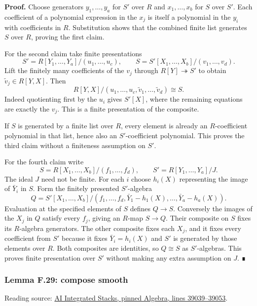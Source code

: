 \documentclass[11pt,a4paper,openany]{report}
\begin{document}
\textbf{Proof.} Choose generators \(y_1,\ldots,y_a\) for \(S'\) over \(R\) and \(x_1,\ldots,x_b\) for \(S\) over \(S'\). Each coefficient of a polynomial expression in the \(x_j\) is itself a polynomial in the \(y_i\) with coefficients in \(R\). Substitution shows that the combined finite list generates \(S\) over \(R\), proving the first claim.

For the second claim take finite presentations \[S'=R[Y_1,\ldots,Y_a]/(u_1,\ldots,u_c),\qquad
S=S'[X_1,\ldots,X_b]/(v_1,\ldots,v_d).\] Lift the finitely many coefficients of the \(v_j\) through \(R[Y]\twoheadrightarrow S'\) to obtain \(\widetilde v_j\in R[Y,X]\). Then \[R[Y,X]/(u_1,\ldots,u_c,\widetilde v_1,\ldots,\widetilde v_d)
\cong S.\] Indeed quotienting first by the \(u_i\) gives \(S'[X]\), where the remaining equations are exactly the \(v_j\). This is a finite presentation of the composite.

If \(S\) is generated by a finite list over \(R\), every element is already an \(R\)-coefficient polynomial in that list, hence also an \(S'\)-coefficient polynomial. This proves the third claim without a finiteness assumption on \(S'\).

For the fourth claim write \[S=R[X_1,\ldots,X_b]/(f_1,\ldots,f_d),\qquad S'=R[Y_1,\ldots,Y_a]/J.\] The ideal \(J\) need not be finite. For each \(i\) choose \(h_i(X)\) representing the image of \(\bar Y_i\) in \(S\). Form the finitely presented \(S'\)-algebra \[Q=S'[X_1,\ldots,X_b]/
(f_1,\ldots,f_d,\bar Y_1-h_1(X),\ldots,\bar Y_a-h_a(X)).\] Evaluation at the specified elements of \(S\) defines \(Q\to S\). Conversely the images of the \(X_j\) in \(Q\) satisfy every \(f_j\), giving an \(R\)-map \(S\to Q\). Their composite on \(S\) fixes its \(R\)-algebra generators. The other composite fixes each \(X_j\), and it fixes every coefficient from \(S'\) because it fixes \(\bar Y_i=h_i(X)\) and \(S'\) is generated by those elements over \(R\). Both composites are identities, so \(Q\cong S\) as \(S'\)-algebras. This proves finite presentation over \(S'\) without making any extra assumption on \(J\). ∎

\label{AG-RG-S05-algebra-lemma-compose-smooth}

\subsubsection{Lemma F.29: compose smooth}\label{AG-RG-S05-lemma-f.29-compose-smooth}

Reading source: \href{https://github.com/KokunoYumeto/unofficial-stacks-project-ai-drafts/blob/565b10e987aba5969b21145a0833f42d69f96790/algebra.tex\#L39039-L39053}{AI Integrated Stacks, pinned Algebra, lines 39039--39053}.
\end{document}
